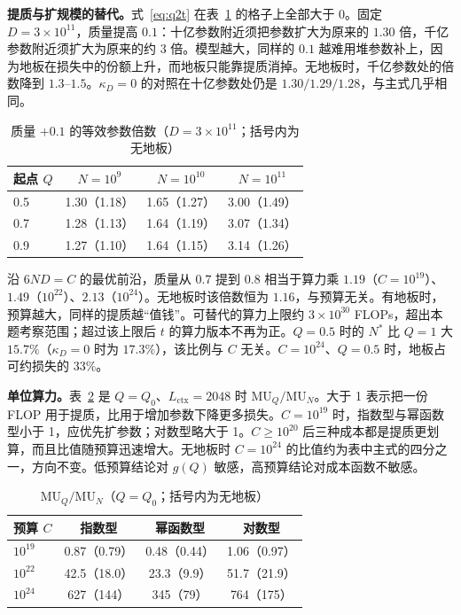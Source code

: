 \textbf{提质与扩规模的替代。}式~\eqref{eq:q2t} 在表~\ref{tab:q2sub} 的格子上全部大于 0。固定 $D=3\times 10^{11}$，质量提高 $0.1$：十亿参数附近须把参数扩大为原来的 $1.30$ 倍，千亿参数附近须扩大为原来的约 $3$ 倍。模型越大，同样的 $0.1$ 越难用堆参数补上，因为地板在损失中的份额上升，而地板只能靠提质消掉。无地板时，千亿参数处的倍数降到 $1.3$--$1.5$。$\kappa_D=0$ 的对照在十亿参数处仍是 $1.30/1.29/1.28$，与主式几乎相同。

\begin{table}[htbp]
\centering\small
\caption{质量 $+0.1$ 的等效参数倍数（$D=3\times 10^{11}$；括号内为无地板）}
\label{tab:q2sub}
\begin{tabular}{lccc}
\toprule
起点 $Q$ & $N=10^9$ & $N=10^{10}$ & $N=10^{11}$ \\
\midrule
0.5 & 1.30（1.18） & 1.65（1.27） & 3.00（1.49） \\
0.7 & 1.28（1.13） & 1.64（1.19） & 3.07（1.34） \\
0.9 & 1.27（1.10） & 1.64（1.15） & 3.14（1.26） \\
\bottomrule
\end{tabular}
\end{table}

沿 $6ND=C$ 的最优前沿，质量从 $0.7$ 提到 $0.8$ 相当于算力乘 $1.19$（$C=10^{19}$）、$1.49$（$10^{22}$）、$2.13$（$10^{24}$）。无地板时该倍数恒为 $1.16$，与预算无关。有地板时，预算越大，同样的提质越“值钱”。可替代的算力上限约 $3\times 10^{30}$ FLOPs，超出本题考察范围；超过该上限后 $t$ 的算力版本不再为正。$Q=0.5$ 时的 $N^{*}$ 比 $Q=1$ 大 $15.7\%$（$\kappa_D=0$ 时为 $17.3\%$），该比例与 $C$ 无关。$C=10^{24}$、$Q=0.5$ 时，地板占可约损失的 $33\%$。

\textbf{单位算力。}表~\ref{tab:q2mu} 是 $Q=Q_0$、$L_{\mathrm{ctx}}=2048$ 时 $\mathrm{MU}_Q/\mathrm{MU}_N$。大于 1 表示把一份 FLOP 用于提质，比用于增加参数下降更多损失。$C=10^{19}$ 时，指数型与幂函数型小于 1，应优先扩参数；对数型略大于 1。$C\ge 10^{20}$ 后三种成本都是提质更划算，而且比值随预算迅速增大。无地板时 $C=10^{24}$ 的比值约为表中主式的四分之一，方向不变。低预算结论对 $g(Q)$ 敏感，高预算结论对成本函数不敏感。

\begin{table}[htbp]
\centering\small
\caption{$\mathrm{MU}_Q/\mathrm{MU}_N$（$Q=Q_0$；括号内为无地板）}
\label{tab:q2mu}
\begin{tabular}{lccc}
\toprule
预算 $C$ & 指数型 & 幂函数型 & 对数型 \\
\midrule
$10^{19}$ & 0.87（0.79） & 0.48（0.44） & 1.06（0.97） \\
$10^{22}$ & 42.5（18.0） & 23.3（9.9） & 51.7（21.9） \\
$10^{24}$ & 627（144） & 345（79） & 764（175） \\
\bottomrule
\end{tabular}
\end{table}

